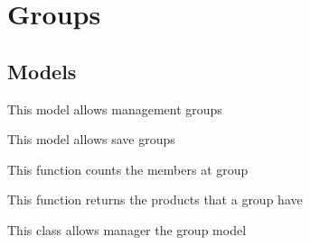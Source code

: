 \documentclass[letterpaper,10pt,english]{sphinxmanual}
\begin{document}
\section{Groups}
\label{modules/groups::doc}\label{modules/groups:groups}

\subsection{Models}
\label{modules/groups:models}
This model allows management groups
\label{modules/groups:module-apps.groups.models}

\begin{fulllineitems}
\label{modules/groups:apps.groups.models.Group}
This model allows save groups

\begin{fulllineitems}
\label{modules/groups:apps.groups.models.Group.count_members}
This function counts the members at group

\end{fulllineitems}


\begin{fulllineitems}
\label{modules/groups:apps.groups.models.Group.getProducts}
This function returns the products that a group have

\end{fulllineitems}


\end{fulllineitems}


\begin{fulllineitems}
\label{modules/groups:apps.groups.models.GroupManager}
This class allows manager the group model

\end{fulllineitems}

\end{document}
